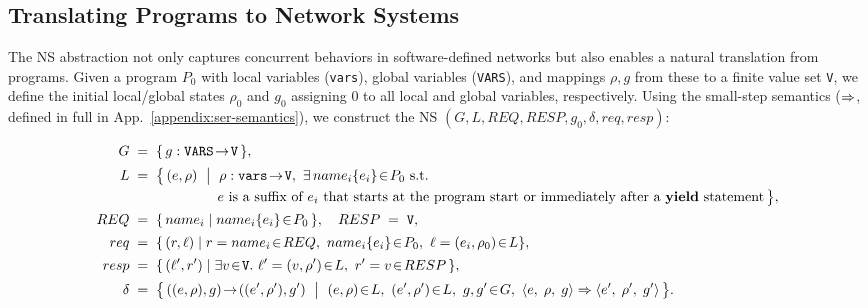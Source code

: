 \subsection{Translating \toolname{} Programs to Network Systems}
\label{subsec:SerToNsTranslation}
%
The NS abstraction not only captures concurrent behaviors in software-defined networks but also enables a natural translation from \toolname{} programs. 
Given a \toolname{} program \(P_0\) with local variables (\texttt{vars}), global variables (\texttt{VARS}), and mappings \(\rho,g\) from these to a finite value set \texttt{V}, we define the initial local/global states $\rho_0$ and $g_0$ assigning $0$ to all local and global variables, respectively. 
Using the small-step semantics ($\mathrel{\Rightarrow}$, defined in full in App.~\ref{appendix:ser-semantics}), we construct the NS $(G, L, \mathit{REQ}, \mathit{RESP}, g_0, \delta, \mathit{req}, \mathit{resp})$:


\[
\begin{aligned}
	G \;&=\; \{\, g : \texttt{VARS}\!\to\! \texttt{V} \,\},\\[0.3ex]
	L \;&=\; \bigl\{\, (e,\rho)\ \bigm|\ \rho:\texttt{vars}\!\to\! \texttt{V},\ \exists\,name_i\{e_i\}\!\in\! P_0\ \text{s.t.} \\[-0.2ex]
	&\qquad\quad\qquad\quad e \text{ is a suffix of } e_i \text{ that starts at the program start or immediately after a } \yieldkw \text{ statement} \,\bigr\},\\[0.3ex]
	REQ \;&=\; \{\, name_i \mid name_i\{e_i\}\!\in\! P_0 \,\},\quad RESP \;=\; \texttt{V},\\[0.3ex]
	req \;&=\; \{\, (r,\ell) \mid r=name_i\!\in\!REQ,\ name_i\{e_i\}\!\in\! P_0,\ \ell=(e_i,\rho_0)\!\in\!L\},\\[0.3ex]
	resp \;&=\; \{\, (\ell',r') \mid \exists v\!\in\!\texttt{V}.\ \ell'=(v,\rho')\!\in\!L,\ r'=v\!\in\!RESP \,\},\\[0.3ex]
\delta \;&=\; \bigl\{\, ((e,\rho),g)\!\to\!((e',\rho'),g') \ \bigm|\ (e,\rho)\!\in\!L,\ (e',\rho')\!\in\!L,\ g,g'\!\in\!G,\ 
\cfg{e}{\rho}{g} \pstep \cfg{e'}{\rho'}{g'} \,\bigr\}.
\end{aligned}
\]


